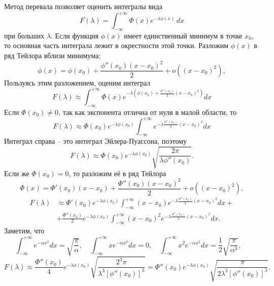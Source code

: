 Метод перевала позволяет оценить интегралы вида
\begin{equation*}
    F(\lambda) = \int_{-\infty}^{+\infty} \Phi(x) e^{-\lambda\phi(x)}\,dx
\end{equation*}
при больших \( \lambda \). Если функция \(\phi(x)\) имеет единственный минимум в точке \( x_0 \), то основная часть интеграла лежит в окрестности этой точки.
Разложим \( \phi(x) \) в ряд Тейлора вблизи минимума:
\begin{equation*}
    \phi(x) = \phi(x_0) + \frac{\phi''(x_0)(x-x_0)^2}{2} + o((x-x_0)^2),
\end{equation*}
Пользуясь этим разложением, оценим интеграл
\begin{equation*}
    F(\lambda) \approx \int_{-\infty}^{+\infty} \Phi(x)
    e^{-\lambda\left(\phi(x_0) + \frac{\phi''(x_0)}{2}(x-x_0)^2\right)} dx
\end{equation*}
Если \( \Phi(x_0) \ne 0 \), так как экспонента отлична от нуля в малой области, то
\begin{equation*}
    F(\lambda) \approx \Phi(x_0)e^{-\lambda\phi(x_0)} \int_{-\infty}^{+\infty}
    e^{-\lambda\frac{\phi''(x_0)}{2}(x-x_0)^2} dx
\end{equation*}
Интеграл справа -- это интеграл Эйлера-Пуассона, поэтому
\begin{equation*}
    F(\lambda) \approx \Phi(x_0)e^{-\lambda\phi(x_0)}
    \sqrt{\frac{2\pi}{\lambda\phi''(x_0)}}.
\end{equation*}
Если же \(\Phi(x_0) = 0 \), то разложим её в ряд Тейлора
\begin{equation*}
    \Phi(x) = \Phi'(x_0)(x-x_0) + \frac{\Phi''(x_0)(x-x_0)^2}{2}
    + o((x-x_0)^2),
\end{equation*}
\begin{align*}
    F(\lambda) &\approx \Phi'(x_0)e^{-\lambda\phi(x_0)}
    \int_{-\infty}^{+\infty}(x-x_0) e^{-\lambda\frac{\phi''(x_0)}{2}(x-x_0)^2} dx + \\
    &+\frac{\Phi''(x_0)}{2}e^{-\lambda\phi(x_0)}
    \int_{-\infty}^{+\infty}(x-x_0)^2 e^{-\lambda\frac{\phi''(x_0)}{2}(x-x_0)^2} dx.
\end{align*}
Заметим, что
\begin{equation*}
    \int_{-\infty}^{+\infty} e^{-\alpha x^2} dx = \sqrt{\frac{\pi}{\alpha}},\quad
    \int_{-\infty}^{+\infty} xe^{-\alpha x^2} dx = 0,\quad
    \int_{-\infty}^{+\infty} x^2e^{-\alpha x^2} dx =\frac{1}{2} \sqrt{\frac{\pi}{\alpha^3}},\quad
\end{equation*}
\begin{equation*}
    F(\lambda) \approx\frac{\Phi''(x_0)}{4}e^{-\lambda\phi(x_0)}
    \sqrt{\frac{2^3\pi}{\lambda^3[\phi''(x_0)]^3}}=
    \Phi''(x_0)e^{-\lambda\phi(x_0)}
    \sqrt{\frac{\pi}{2\lambda^3[\phi''(x_0)]^3}}.
\end{equation*}


